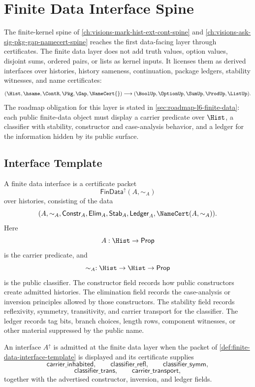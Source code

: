 \chapter{Finite Data Interface Spine}
\label{ch:visions-finite-data-interface-spine}

The finite-kernel spine of \autoref{ch:visions-mark-hist-ext-cont-spine}
and \autoref{ch:visions-ask-sig-pkg-gap-namecert-spine} reaches the first
data-facing layer through certificates.  The finite data layer does not add
truth values, option values, disjoint sums, ordered pairs, or lists as
kernel inputs.  It licenses them as derived interfaces over histories,
history sameness, continuation, package ledgers, stability witnesses, and
name certificates:
$$
(\Hist,\hsame,\ContR,\Pkg,\Gap,\NameCert{})
\longrightarrow
(\BoolUp,\OptionUp,\SumUp,\ProdUp,\ListUp).
$$
The roadmap obligation for this layer is stated in
\autoref{sec:roadmap-l6-finite-data}: each public finite-data object must
display a carrier predicate over $\Hist$, a classifier with stability,
constructor and case-analysis behavior, and a ledger for the information
hidden by its public surface.

\section{Interface Template}
\label{sec:finite-data-interface-template}

\begin{definition}
\label{def:finite-data-interface-template}
A finite data interface is a certificate packet
$$
\mathsf{FinData}^{\uparrow}(A,\sim_A)
$$
over histories, consisting of the data
$$
(A,\sim_A,\mathsf{Constr}_A,\mathsf{Elim}_A,
\mathsf{Stab}_A,\mathsf{Ledger}_A,\NameCert(A,\sim_A)).
$$
Here
$$
A:\Hist\to\mathsf{Prop}
$$
is the carrier predicate, and
$$
\sim_A:\Hist\to\Hist\to\mathsf{Prop}
$$
is the public classifier.  The constructor field records how public
constructors create admitted histories.  The elimination field records the
case-analysis or inversion principles allowed by those constructors.  The
stability field records reflexivity, symmetry, transitivity, and carrier
transport for the classifier.  The ledger records tag bits, branch choices,
length rows, component witnesses, or other material suppressed by the public
name.
\end{definition}

\begin{definition}
\label{def:finite-data-admission}
An interface $A^{\uparrow}$ is admitted at the finite data layer when the
packet of \autoref{def:finite-data-interface-template} is displayed and its
certificate supplies
$$
\mathsf{carrier\_inhabited},
\qquad
\mathsf{classifier\_refl},
\qquad
\mathsf{classifier\_symm},
$$
$$
\mathsf{classifier\_trans},
\qquad
\mathsf{carrier\_transport},
$$
together with the advertised constructor, inversion, and ledger fields.
\end{definition}

